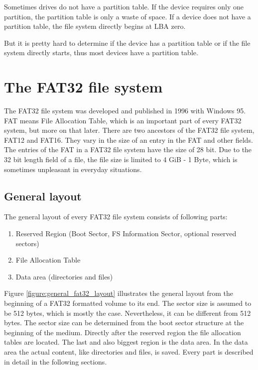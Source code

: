 Sometimes drives do not have a partition table. If the device requires only one partition, the partition table is only a waste of space. If a device does not have a partition table, the file system directly begins at LBA zero.

But it is pretty hard to determine if the device has a partition table or if the file system directly starts, thus most devices have a partition table\cite{usb_ms_jan}. 

\section{The FAT32 file system}

The FAT32 file system was developed and published in 1996 with Windows 95. FAT means File Allocation Table, which is an important part of every FAT32 system, but more on that later. There are two ancestors of the FAT32 file system, FAT12 and FAT16. They vary in the size of an entry in the FAT and other fields. The entries of the FAT in a FAT32 file system have the size of 28 bit. Due to the 32 bit length field of a file, the file size is limited to 4 GiB - 1 Byte, which is sometimes unpleasant in everyday situations\cite{wiki_fat}.

\subsection{General layout}

The general layout of every FAT32 file system consists of following parts\cite{fatgen103, wiki_fat}:

\begin{enumerate}
\item Reserved Region (Boot Sector, FS Information Sector, optional reserved sectors)
\item File Allocation Table
\item Data area (directories and files)
\end{enumerate}

Figure \ref{figure:general_fat32_layout} illustrates the general layout from the beginning of a FAT32 formatted volume to its end. The sector size is assumed to be 512 bytes, which is mostly the case. Nevertheless, it can be different from 512 bytes. The sector size can be determined from the boot sector structure at the beginning of the medium. Directly after the reserved region the file allocation tables are located. The last and also biggest region is the data area. In the data area the actual content, like directories and files, is saved. Every part is described in detail in the following sections.

